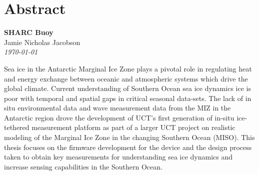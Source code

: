 \documentclass[a4paper, 12pt, oneside, openright, parskip=full]{book}
\newcommand{\auth}{Jamie Nicholas Jacobson}								%
\newcommand{\titl}{SHARC Buoy}						%
\begin{document}
\chapter{Abstract}				
\label{ch:abs}

%
\begin{center}
	\textbf{\Large \titl}\\
			\vskip 0.2cm
			\auth\\
			\vskip 0.2cm
	\textit{\footnotesize\today}
			\vskip 1cm
\end{center}

Sea ice in the Antarctic Marginal Ice Zone plays a pivotal role in regulating heat and energy exchange between oceanic and atmospheric systems which drive the global climate. Current understanding of Southern Ocean sea ice dynamics ice is poor with temporal and spatial gaps in critical seasonal data-sets. The lack of in situ environmental data and wave measurement data from the MIZ in the Antarctic region drove the development of UCT’s first generation of in-situ ice-tethered measurement platform as part of a larger UCT project on realistic modeling of the Marginal Ice Zone in the changing Southern Ocean (MISO). This thesis focuses on the firmware development for the device and the design process taken to obtain key measurements for understanding sea ice dynamics and increase sensing capabilities in the Southern Ocean.\par 
\end{document}
